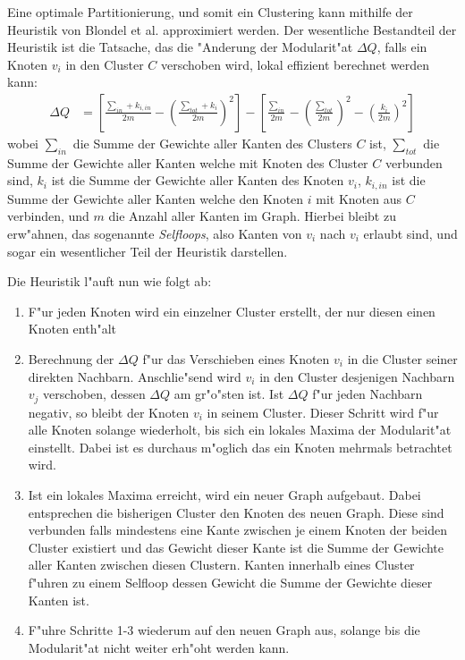 \documentclass[journal]{vgtc}
\begin{document}
    Eine optimale Partitionierung, und somit ein Clustering kann mithilfe der Heuristik von Blondel et al. \cite{modularity_heuristic}
    approximiert werden. Der wesentliche Bestandteil
    der Heuristik ist die Tatsache, das die "Anderung der Modularit"at $\Delta Q$, falls ein Knoten $v_i$ in den Cluster $C$ verschoben
    wird, lokal effizient berechnet werden kann:
    \begin{align}
     \Delta Q &= \left[ \frac{\sum_{in}+k_{i,in}}{2m} - \left( \frac{\sum_{tot}+k_i}{2m} \right)^2 \right] -
     \left[ \frac{\sum_{in}}{2m} - \left( \frac{\sum_{tot}}{2m} \right)^2 - \left( \frac{k_i}{2m} \right)^2 \right]
    \end{align}
    wobei $\sum_{in}$ die Summe der Gewichte aller Kanten des Clusters $C$ ist, $\sum_{tot}$ die Summe der Gewichte aller Kanten welche
    mit Knoten des Cluster $C$ verbunden sind, $k_i$ ist die Summe der Gewichte aller Kanten des Knoten $v_i$, $k_{i,in}$ ist die
    Summe der Gewichte aller Kanten welche den Knoten $i$ mit Knoten aus $C$ verbinden, und $m$ die Anzahl aller Kanten im Graph.
    Hierbei bleibt zu erw"ahnen, das sogenannte \emph{Selfloops}, also Kanten von $v_i$ nach $v_i$ erlaubt sind, und sogar
    ein wesentlicher Teil der Heuristik darstellen.
    
    Die Heuristik l"auft nun wie folgt ab:
    \begin{enumerate}
      \item F"ur jeden Knoten wird ein einzelner Cluster erstellt, der nur diesen einen Knoten enth"alt
      \item Berechnung der $\Delta Q$ f"ur das Verschieben eines Knoten $v_i$ in die Cluster seiner 
      		direkten Nachbarn. Anschlie"send wird $v_i$ in den Cluster desjenigen Nachbarn $v_j$ verschoben,
      		dessen $\Delta Q$ am gr"o"sten ist. Ist $\Delta Q$ f"ur jeden Nachbarn negativ,
      		so bleibt der Knoten $v_i$ in seinem Cluster. Dieser Schritt wird f"ur alle Knoten solange wiederholt, bis sich
      		ein lokales Maxima der Modularit"at einstellt. Dabei ist es durchaus m"oglich das ein Knoten
      		mehrmals betrachtet wird.
      \item Ist ein lokales Maxima erreicht, wird ein neuer Graph aufgebaut. Dabei entsprechen die bisherigen
      		Cluster den Knoten des neuen Graph. Diese sind verbunden falls mindestens eine Kante zwischen
      		je einem Knoten der beiden Cluster existiert und das Gewicht dieser Kante ist die Summe
      		der Gewichte aller Kanten zwischen diesen Clustern. Kanten innerhalb eines Cluster f"uhren zu einem
      		Selfloop dessen Gewicht die Summe der Gewichte dieser Kanten ist. 
      \item F"uhre Schritte 1-3 wiederum auf den neuen Graph aus, solange bis die Modularit"at nicht
      		weiter erh"oht werden kann.
    \end{enumerate}
    
\end{document}
